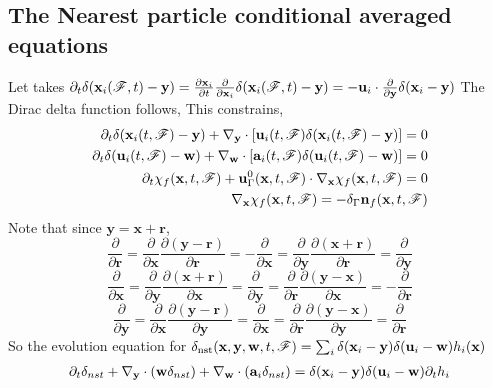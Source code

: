 \subsection*{The Nearest particle conditional averaged equations}
Let takes 
$\partial_t \delta(\textbf{x}_i(\mathscr{F},t) - \textbf{y}) 
= \frac{\partial \textbf{x}_i}{\partial t} \frac{\partial }{\partial \textbf{x}_i} \delta(\textbf{x}_i(\mathscr{F},t) - \textbf{y})
= - \textbf{u}_i \cdot \frac{\partial }{\partial \textbf{y}} \delta(\textbf{x}_i - \textbf{y})$
The Dirac delta function follows, This constrains,
\begin{align*}
    \partial_t \delta(\textbf{x}_i(t,\mathscr{F})  - \textbf{y})
    + {\mathbf{\nabla}_\textbf{y}} \cdot [\textbf{u}_i(t,\mathscr{F})  \delta(\textbf{x}_i(t,\mathscr{F})  - \textbf{y})]
    = 0\\
    \partial_t \delta(\textbf{u}_i(t,\mathscr{F}) -\textbf{w})
    + {\mathbf{\nabla}_\textbf{w}} \cdot [\textbf{a}_i(t,\mathscr{F})  \delta(\textbf{u}_i(t,\mathscr{F})  - \textbf{w})]
    = 0\\
    \partial_t \chi_f(\textbf{x},t,\mathscr{F}) 
    + \textbf{u}_\Gamma^0(\textbf{x},t,\mathscr{F}) \cdot {\mathbf{\nabla}_\textbf{x}} \chi_f(\textbf{x},t,\mathscr{F}) = 0 \\
    {\mathbf{\nabla}_\textbf{x}} \chi_f(\textbf{x},t,\mathscr{F}) = - \delta_\Gamma \textbf{n}_f(\textbf{x},t,\mathscr{F})
\end{align*}
Note that since $\textbf{y} = \textbf{x} + \textbf{r}$, 
\begin{equation*}
    \frac{\partial }{\partial \textbf{r}}
    = \frac{\partial }{\partial \textbf{x}}
    \frac{\partial (\textbf{y} - \textbf{r})}{\partial \textbf{r}}
    = - \frac{\partial }{\partial \textbf{x}}
    = \frac{\partial }{\partial \textbf{y}}
    \frac{\partial (\textbf{x} + \textbf{r})}{\partial \textbf{r}}
    = \frac{\partial }{\partial \textbf{y}}
\end{equation*}
\begin{equation*}
    \frac{\partial }{\partial \textbf{x}}
    = \frac{\partial }{\partial \textbf{y}}
    \frac{\partial (\textbf{x} + \textbf{r})}{\partial \textbf{x}}
    = \frac{\partial }{\partial \textbf{y}}
    = \frac{\partial }{\partial \textbf{r}}
    \frac{\partial (\textbf{y} - \textbf{x})}{\partial \textbf{x}}
    = - \frac{\partial }{\partial \textbf{r}}
\end{equation*}
\begin{equation*}
    \frac{\partial }{\partial \textbf{y}}
    = \frac{\partial }{\partial \textbf{x}}
    \frac{\partial (\textbf{y} - \textbf{r})}{\partial \textbf{y}}
    = \frac{\partial }{\partial \textbf{x}}
    = \frac{\partial }{\partial \textbf{r}}
    \frac{\partial (\textbf{y} - \textbf{x})}{\partial \textbf{y}}
    = \frac{\partial }{\partial \textbf{r}}
\end{equation*}
So the evolution equation for 
$\delta_\text{nst}(\textbf{x},\textbf{y},\textbf{w},t,\mathscr{F}) =  \sum_i \delta(\textbf{x}_i -\textbf{y}) \delta(\textbf{u}_i - \textbf{w}) h_i(\textbf{x})$
\begin{align*}
    \partial_t \delta_{nst}
    + {\mathbf{\nabla}_\textbf{y}} \cdot (\textbf{w} \delta_{nst})
    + {\mathbf{\nabla}_\textbf{w}} \cdot (\textbf{a}_i  \delta_{nst})
    = 
    \delta(\textbf{x}_i -\textbf{y}) \delta(\textbf{u}_i - \textbf{w}) \partial_t h_i
\end{align*}


